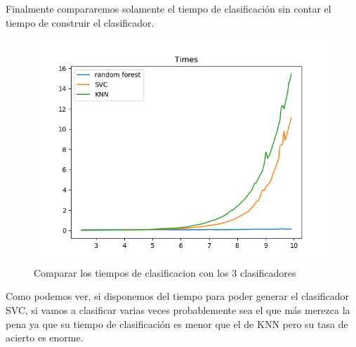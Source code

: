 \documentclass[8pt,a4paper]{article}
\begin{document}
Finalmente compararemos solamente el tiempo de clasificación sin contar el tiempo de construir el clasificador.

\begin{figure}[htbp]
    \centering
    \includegraphics[width=\textwidth]{./TiemposSoloClasificacion.png}
    \caption{Comparar los tiempos de clasificacion con los 3 clasificadores}
\end{figure}

Como podemos ver, si disponemos del tiempo para poder generar el clasificador SVC, si vamos a clasificar varias veces probablemente sea el que más merezca la pena ya que su tiempo de clasificación es menor que el de KNN pero su tasa de acierto es enorme.
\end{document}
